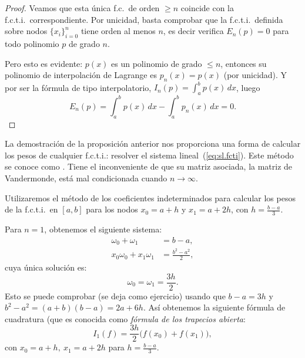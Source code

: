 \begin{proof}
   Veamos que esta única f.c.\ de orden $\ge n$ coincide con
  la f.c.t.i.\ correspondiente. Por unicidad, basta
  comprobar que la f.c.t.i.\ definida sobre nodos $\{x_i\}_{i=0}^n$
  tiene orden al menos $n$, es decir verifica $E_n(p)=0$ para todo
  polinomio $p$ de grado $n$.

  Pero esto es evidente: $p(x)$ es un polinomio de grado $\le n$,
  entonces su polinomio de interpolación de Lagrange es $p_n(x)=p(x)$
  (por unicidad).  Y por ser la fórmula de tipo interpolatorio,
  $I_n(p)=\int_a^b p(x)\,dx$, luego
  $$E_n(p)=\int_a^b p(x)\,dx - \int_a^b p_n(x)\,dx =0.$$
\end{proof}

\begin{remark}
  \label{rk:6}
  La demostración de la proposición anterior nos proporciona una forma
  de calcular los pesos de cualquier f.c.t.i.: resolver el sistema
lineal~(\ref{eq:sl.fcti}). Este método se conoce como . Tiene el inconveniente de que su
matriz asociada, la matriz de Vandermonde, está mal condicionada
  cuando $n\to\infty$.
\end{remark}

\begin{example}
  \label{ex:coef-indetermin:formula-trapecios-abierta}
  Utilizaremos el método de los coeficientes indeterminados para
  calcular los pesos de la f.c.t.i.\ en $[a,b]$ para los nodos
  $x_0=a+h$ y $x_1=a+2h$, con $h=\frac{b-a}{3}$.

  Para $n=1$, obtenemos el siguiente sistema:
  \begin{align*}
    \omega_0 + \omega_1 &= b-a,
    \\
    x_0\omega_0 + x_1\omega_1 &= \frac{b^2-a^2}{2},
  \end{align*}
  cuya única solución es:
  \begin{equation*}
    \omega_0=\omega_1=\frac{3h}{2}.
  \end{equation*}
  Esto se puede comprobar (se deja como ejercicio) usando
  que $b-a=3h$ y $b^2-a^2 = (a+b)(b-a)=2a + 6h$.
  Así obtenemos la siguiente fórmula de cuadratura (que es conocida
  como \textit{fórmula de los trapecios abierta}:
  \begin{equation*}
    I_1(f)=\frac{3h}{2}
    \big(
      f(x_0)+f(x_1)
    \big),
  \end{equation*}
  con $x_0=a+h, \ x_1=a+2h$ para $h=\frac{b-a}{3}$.
\end{example}

